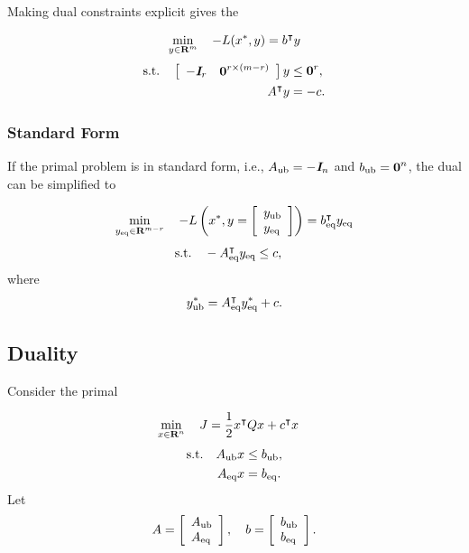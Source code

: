 \documentclass{article}
\begin{document}
    Making dual constraints explicit gives the \LP

    \begin{align*}
        \min_{y\in\textbf{R}^m}\quad -L(x^*,y)=b^\intercal y
    \end{align*}
    \begin{align*}
        \text{s.t.}\quad  \left[\begin{array}{lllllllllllllllllll}-\emph{\textbf{I}}_{r}&\textbf{0}^{{r}\times (m-{r})}\end{array}\right]y&\leq \textbf{0}^{r},\\
        A^\intercal y &=-c.
    \end{align*}

    \subsubsection{Standard Form}
    If the primal problem is in standard form, i.e., $A_{\text{ub}} = -\emph{\textbf{I}}_n$ and $b_{\text{ub}}=\textbf{0}^n$,
    the dual can be simplified to \cite[p.~224]{bv_cvxbook}

    \begin{align*}
        \min_{y_{\text{eq}}\in \textbf{R}^{m-{r}} }\quad -L\left(x^*,y=\left[\begin{array}{lllllllllllllllllll}y_{\text{ub}}\\y_{\text{eq}}\end{array}\right]\right)=b_{\text{eq}}^\intercal y_{\text{eq}}
    \end{align*}
    \begin{align*}
        \text{s.t.}\quad -A_{\text{eq}}^\intercal y_{\text{eq}}&\leq c,
    \end{align*}
    where
    \begin{align*}
        y_{\text{ub}}^*=A_{\text{eq}}^\intercal y_{\text{eq}}^*+c.
    \end{align*}

\subsection{\QP Duality}

    Consider the primal \QP 

    \begin{align*}
        \min_{x\in\textbf{R}^n}\quad
        J
        &=\frac{1}{2} x^\intercal Q x + c^\intercal x
    \end{align*}
    \begin{align*}
        \text{s.t.}\quad A_{\text{ub}} x&\leq b_{\text{ub}},\\
        A_{\text{eq}} x &= b_{\text{eq}}.\\
    \end{align*}
    Let
    \begin{align*}
        A = \left[\begin{array}{lllllllllllllllllll}A_{\text{ub}} \\ A_{\text{eq}}\end{array}\right],\quad
        b = \left[\begin{array}{lllllllllllllllllll}b_{\text{ub}}\\b_{\text{eq}}\end{array}\right].
    \end{align*}
\end{document}
